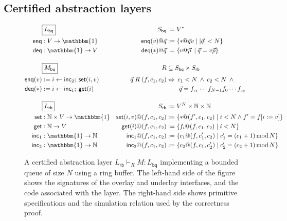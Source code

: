 \documentclass[format=sigplan,authordraft]{acmart}
\newcommand{\kw}[1]{\ensuremath{ \mathsf{#1} }}
\begin{document}

\subsection{Certified abstraction layers}

\begin{figure*} %
  \begin{minipage}{.9\textwidth}
    \begin{align*}
      & \fbox{$L_\kw{bq}$} &
        S_\kw{bq} &:= V^* \\
      \kw{enq} &: V \rightarrow \mathbbm{1} &
        \kw{enq}(v)@\vec{q} &:= \{ * @ \vec{q} v \mid |\vec{q}| < N \} \\
      \kw{deq} &: \mathbbm{1} \rightarrow V &
        \kw{deq}(*)@\vec{q} &:= \{ v @ \vec{p} \: \mid \vec{q} = v \vec{p} \}
      \\[1em]
      & \fbox{$M_\kw{bq}$} &
        R &\subseteq S_\kw{bq} \times S_\kw{rb} \\
      \kw{enq}(v) &:= i \leftarrow \kw{inc}_2 ; \: \kw{set}(i, v) &
        \vec{q} \mathrel{R} (f, c_1, c_2) &\Leftrightarrow
        \: c_1 < N \:\wedge\: c_2 < N \:\wedge\: {}
      \\
      \kw{deq}(*) &:= i \leftarrow \kw{inc}_1 ; \: \kw{get}(i) &
        & \qquad \vec{q} = f_{c_1} \cdots f_{N-1} f_0 \cdots f_{c_2}
      \\[1em]
      & \fbox{$L_\kw{rb}$} &
        S_\kw{rb} &:= V^N \times \mathbb{N} \times \mathbb{N}
      \\
      \kw{set} &: \mathbb{N} \times V \rightarrow \mathbbm{1} &
        \kw{set}(i, v)@(f, c_1, c_2) &:=
        \{ *@(f', c_1, c_2) \mid i < N \wedge f' = f[i := v] \}
      \\
      \kw{get} &: \mathbb{N} \rightarrow V &
        \kw{get}(i)@(f, c_1, c_2) &:=
        \{ f_i@(f, c_1, c_2) \mid i < N \}
      \\
      \kw{inc}_1 &: \mathbbm{1} \rightarrow \mathbb{N} &
        \kw{inc}_1@(f, c_1, c_2) &:=
        \{ c_1@(f, c_1', c_2) \mid
           c_1' = (c_1 + 1) \mathop{\mathrm{mod}} N \}
      \\
      \kw{inc}_2 &: \mathbbm{1} \rightarrow \mathbb{N} &
        \kw{inc}_2@(f, c_1, c_2) &:=
        \{ c_2@(f, c_1, c_2') \mid
           c_2' = (c_2 + 1) \mathop{\mathrm{mod}} N \}
    \end{align*}
  \end{minipage}
  \caption{A certified abstraction layer
    $L_\kw{rb} \vdash_R M : L_\kw{bq}$
    implementing a bounded queue of size $N$
    using a ring buffer.
    The left-hand side of the figure shows
    the signatures of the overlay and underlay interfaces,
    and the code associated with the layer.
    The right-hand side shows primitive specifications
    and the simulation relation used by the correctness proof.}
  \label{fig:cal}
\end{figure*}
\end{document}
